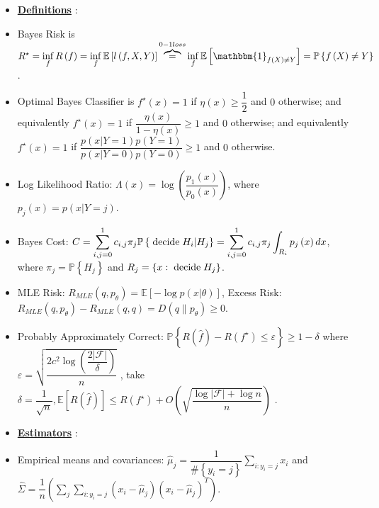 \documentclass{article}
\begin{document}
\begin{itemize}
\item \textbf{\underline{Definitions}} :
\item Bayes Risk is $R^\star  = \displaystyle\inf_{f} R\left(f\right) = \displaystyle\inf_{f} \mathbb{E}\left[l\left(f, X, Y\right)\right] \overbrace{=}^{0-1 loss} \displaystyle\inf_{f} \mathbb{E}\left[\mathbbm{1}_{f\left(X\right) \neq  Y}\right] = \mathbb{P}\left\{f\left(X\right) \neq  Y\right\}$.
\item Optimal Bayes Classifier is $f^\star \left(x\right) = 1$ if $\eta\left(x\right) \geq  \dfrac{1}{2}$ and $0$ otherwise; and equivalently $f^\star \left(x\right) = 1$ if $\dfrac{\eta\left(x\right)}{1 - \eta\left(x\right)} \geq 1$ and $0$ otherwise; and equivalently $f^\star \left(x\right) = 1$ if $\dfrac{p\left(x | Y = 1\right) p\left(Y = 1\right)}{p\left(x | Y = 0\right) p\left(Y = 0\right)} \geq  1$ and $0$ otherwise.
\item Log Likelihood Ratio: $\Lambda\left(x\right) = \log \left(\dfrac{p_{1}\left(x\right)}{p_{0}\left(x\right)}\right)$, where $p_{j}\left(x\right) = p\left(x | Y = j\right)$.
\item Bayes Cost: $C  = \displaystyle\sum_{i,j=0}^{1} c_{i,j} \pi_{j} \mathbb{P}\left\{\text{\;decide\;} H_{i} | H_{j}\right\} = \displaystyle\sum_{i,j=0}^{1} c_{i,j} \pi_{j}  \displaystyle\int_{R_{i}} p_{j}\left(x\right) dx$, where $\pi_{j} = \mathbb{P}\left\{H_{j}\right\}$ and $R_{j} = \left\{x : \text{\;decide\;} H_{j}\right\}$.
\item MLE Risk: $R_{MLE}\left(q, p_{\theta}\right) = \mathbb{E}\left[- \log p\left(x | \theta\right)\right]$, Excess Risk: $R_{MLE}\left(q, p_{\theta}\right) - R_{MLE}\left(q, q\right) = D\left(q \| p_{\theta}\right) \geq  0$.
\item Probably Approximately Correct: $\mathbb{P}\left\{R\left(\hat{f}\right) - R\left(f^\star \right) \leq  \varepsilon\right\} \geq  1 - \delta$ where $\varepsilon = \sqrt{\dfrac{2 c^{2} \log\left(\dfrac{2 | \mathcal{F} |}{\delta}\right)}{n}}$ , take $\delta = \dfrac{1}{\sqrt{n}}, \mathbb{E}\left[R\left(\hat{f}\right)\right] \leq  R\left(f^\star \right) + O\left(\sqrt{\dfrac{\log | \mathcal{F} | + \log n}{n}}\right)$ .
\item \textbf{\underline{Estimators}} :
\item Empirical means and covariances: $\hat{\mu}_{j} = \dfrac{1}{\# \left\{y_{i} = j\right\}} \displaystyle\sum_{i : y_{i} = j} x_{i}$ and $\hat{\Sigma} = \dfrac{1}{n} \left(\displaystyle\sum_{j} \displaystyle\sum_{i : y_{i} = j} \left(x_{i} - \hat{\mu}_{j}\right) \left(x_{i} - \hat{\mu}_{j}\right)^{T}\right)$.

\end{itemize}
\end{document}
